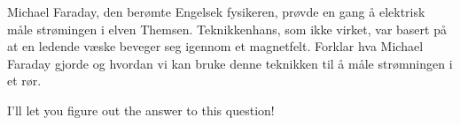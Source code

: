 


Michael Faraday, den berømte Engelsek fysikeren, prøvde en gang å elektrisk måle strømingen i elven Themsen. Teknikkenhans, som ikke virket, var basert på at en ledende væske beveger seg igennom et magnetfelt. Forklar hva Michael Faraday gjorde og hvordan vi kan bruke denne teknikken til å måle strømningen i et rør.








I'll let you figure out the answer to this question!











